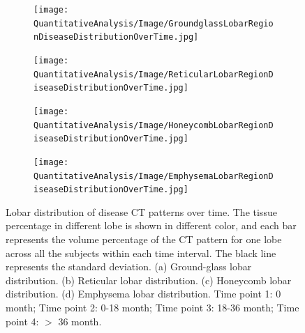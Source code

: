 \begin{figure}[htbp] 
\centering
\begin{subfigure}{.46\linewidth}%
  \texttt{[image: QuantitativeAnalysis/Image/GroundglassLobarRegionDiseaseDistributionOverTime.jpg]} %
  \caption{}
  \label{fig:LobarRegionDiseaseDistributionOverTime-a} 
\end{subfigure} 
\hspace{.3in}
\begin{subfigure}{.46\linewidth}%
  \texttt{[image: QuantitativeAnalysis/Image/ReticularLobarRegionDiseaseDistributionOverTime.jpg]}
  \caption{}
  \label{fig:LobarRegionDiseaseDistributionOverTime-b}
\end{subfigure}
\begin{subfigure}{.46\linewidth}%
  \texttt{[image: QuantitativeAnalysis/Image/HoneycombLobarRegionDiseaseDistributionOverTime.jpg]} %
  \caption{}
  \label{fig:LobarRegionDiseaseDistributionOverTime-c} 
\end{subfigure} 
\hspace{.3in}
\begin{subfigure}{.46\linewidth}%
  \texttt{[image: QuantitativeAnalysis/Image/EmphysemaLobarRegionDiseaseDistributionOverTime.jpg]}
  \caption{}
  \label{fig:LobarRegionDiseaseDistributionOverTime-d}
\end{subfigure}
\caption{Lobar distribution of disease CT patterns over time. The tissue percentage in different lobe is shown in different color, and each bar represents the volume percentage of the CT pattern for one lobe across all the subjects within each time interval. The black line represents the standard deviation. (a) Ground-glass lobar distribution. (b) Reticular lobar distribution. (c) Honeycomb lobar distribution. (d) Emphysema lobar distribution. Time point 1: 0 month; Time point 2: 0-18 month; Time point 3: 18-36 month; Time point 4: $>$ 36 month.}
\label{fig:LobarRegionDiseaseDistributionOverTime}
\end{figure}

